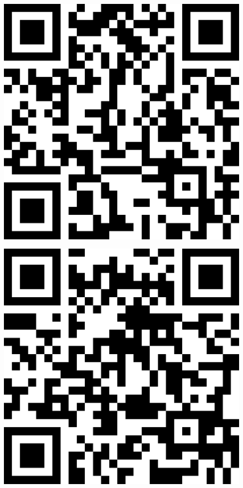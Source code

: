 \documentclass[letterpaper]{article}
\begin{document}
 \endgroup 
 \vspace*{\fill} 
 \pagebreak 
{} 
 \vspace*{\fill} 
 \begingroup 
 \centerline{\includegraphics[scale=1,width=5in,height=5in]{BreakOutRoom4.png}} 
 \endgroup 
 \vspace*{\fill} 
 \pagebreak 
{} 
 \vspace*{\fill} 
 \begingroup 
 \centerline{\includegraphics[scale=1,width=5in,height=5in]{CSOffice.png}} 
\end{document}
